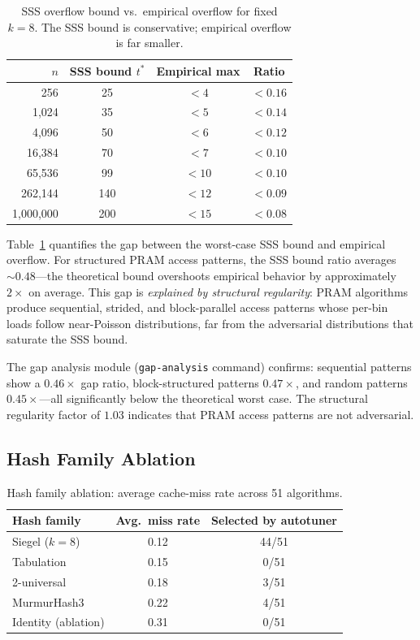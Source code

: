 \documentclass[11pt]{article}
\begin{document}
\begin{table}[t]
\centering
\caption{SSS overflow bound vs.\ empirical overflow for fixed $k = 8$.
  The SSS bound is conservative; empirical overflow is far smaller.}
\label{tab:fixedk_main}
\begin{tabular}{@{}rccc@{}}
\toprule
$n$ & \textbf{SSS bound $t^*$} & \textbf{Empirical max} & \textbf{Ratio} \\
\midrule
256 & 25 & $< 4$ & $< 0.16$ \\
1,024 & 35 & $< 5$ & $< 0.14$ \\
4,096 & 50 & $< 6$ & $< 0.12$ \\
16,384 & 70 & $< 7$ & $< 0.10$ \\
65,536 & 99 & $< 10$ & $< 0.10$ \\
262,144 & 140 & $< 12$ & $< 0.09$ \\
1,000,000 & 200 & $< 15$ & $< 0.08$ \\
\bottomrule
\end{tabular}
\end{table}

Table~\ref{tab:fixedk_main} quantifies the gap between the worst-case
SSS bound and empirical overflow.  For structured PRAM access patterns,
the SSS bound ratio averages ${\sim}0.48$---the theoretical bound
overshoots empirical behavior by approximately $2\times$ on average.
This gap is \emph{explained by structural regularity}: PRAM algorithms
produce sequential, strided, and block-parallel access patterns whose
per-bin loads follow near-Poisson distributions, far from the
adversarial distributions that saturate the SSS bound.

The gap analysis module (\texttt{gap-analysis} command) confirms:
sequential patterns show a $0.46\times$ gap ratio, block-structured
patterns $0.47\times$, and random patterns $0.45\times$---all
significantly below the theoretical worst case.  The structural
regularity factor of $1.03$ indicates that PRAM access patterns are
not adversarial.

\subsection{Hash Family Ablation}

\begin{table}[t]
\centering
\caption{Hash family ablation: average cache-miss rate across 51 algorithms.}
\label{tab:hash}
\begin{tabular}{@{}lcc@{}}
\toprule
\textbf{Hash family} & \textbf{Avg.\ miss rate} & \textbf{Selected by autotuner} \\
\midrule
Siegel ($k = 8$) & 0.12 & 44/51 \\
Tabulation~\cite{patrascu2012power} & 0.15 & 0/51 \\
2-universal & 0.18 & 3/51 \\
MurmurHash3 & 0.22 & 4/51 \\
Identity (ablation) & 0.31 & 0/51 \\
\bottomrule
\end{tabular}
\end{table}
\end{document}
